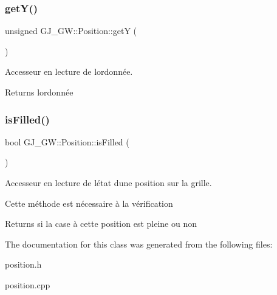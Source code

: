 \subsubsection{\texorpdfstring{get\+Y()}{getY()}}
{\footnotesize\ttfamily unsigned G\+J\+\_\+\+G\+W\+::\+Position\+::getY (\begin{DoxyParamCaption}{ }\end{DoxyParamCaption})\hspace{0.3cm}{\ttfamily [inline]}}



Accesseur en lecture de l\textquotesingle{}ordonnée. 

\begin{DoxyReturn}{Returns}
l\textquotesingle{}ordonnée 
\end{DoxyReturn}
\hypertarget{class_g_j___g_w_1_1_position_a880608d66230d1628c70ce79939c8df9}{}\label{class_g_j___g_w_1_1_position_a880608d66230d1628c70ce79939c8df9} 
\subsubsection{\texorpdfstring{is\+Filled()}{isFilled()}}
{\footnotesize\ttfamily bool G\+J\+\_\+\+G\+W\+::\+Position\+::is\+Filled (\begin{DoxyParamCaption}{ }\end{DoxyParamCaption})\hspace{0.3cm}{\ttfamily [inline]}}



Accesseur en lecture de l\textquotesingle{}état d\textquotesingle{}une position sur la grille. 

Cette méthode est nécessaire à la vérification

\begin{DoxyReturn}{Returns}
si la case à cette position est pleine ou non 
\end{DoxyReturn}


The documentation for this class was generated from the following files\+:\begin{DoxyCompactItemize}
\item 
position.\+h\item 
position.\+cpp\end{DoxyCompactItemize}
